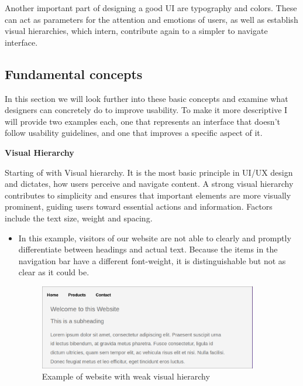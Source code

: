 \blankLine

Another important part of designing a good UI are typography and colors. These
can act as parameters for the attention and emotions of users, as well as establish visual hierarchies, which intern, contribute again to a simpler to navigate interface. \autocite{Paul:UIUXIntroduction}

\subsection{Fundamental concepts}
In this section we will look further into these basic concepts and examine what designers can concretely do to improve usability. To make it more descriptive I will provide two examples each, one that represents an interface that doesn't follow usability guidelines, and one that improves a specific aspect of it.

\blankLine

\textbf{Visual Hierarchy}

Starting of with Visual hierarchy. It is the most basic principle in UI/UX design and dictates, how users perceive and navigate content. A strong visual hierarchy contributes to simplicity and ensures that important elements are more visually prominent, guiding users toward essential actions and information. Factors include the text size, weight and spacing. 

\blankLine
\begin{itemize}
    \item{
    In this example, visitors of our website are not able to clearly and promptly differentiate between headings and actual text. Because the items in the navigation bar have a different font-weight, it is distinguishable but not as clear as it could be.
    \begin{figure} [H]
        \center
        \includegraphics [width=0.9\textwidth] {images/paul/usabilityExamples/badVisualHierarchy.png}
        \caption{Example of website with weak visual hierarchy}
    \end{figure}}
\end{itemize}

